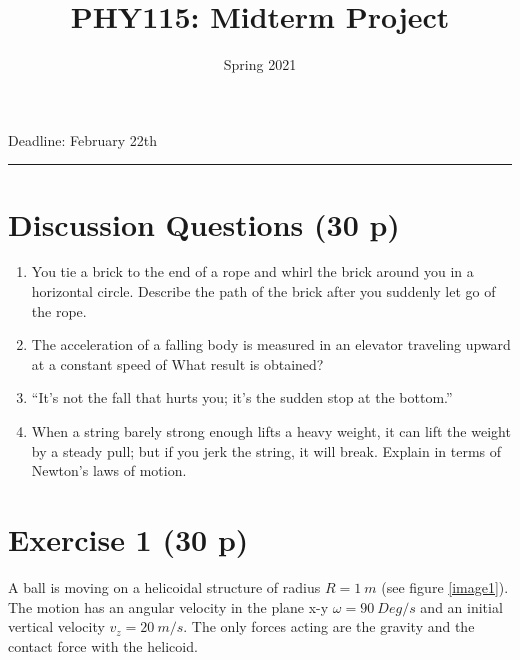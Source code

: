 \documentclass[12pt]{article}
\title{PHY115: Midterm Project}
\author{Spring 2021}
\date{}
\newcommand{\blankline}{\quad\pagebreak[2]}
\begin{document}
\maketitle





\begin{center}
 Deadline: February 22th    
\end{center}
\hrule






\section*{Discussion Questions (30 p)}

\begin{enumerate}
    \item You tie a brick to the end of a rope and whirl the brick around
    you in a horizontal circle. Describe the path of the brick after you
    suddenly let go of the rope.
    \item The acceleration of a falling body is measured in an elevator
    traveling upward at a constant speed of What result is
    obtained?
    \item “It’s not the fall that hurts you; it’s the sudden stop at the
    bottom.”
    \item When a string barely strong enough lifts a heavy weight, it
    can lift the weight by a steady pull; but if you jerk the string, it will
    break. Explain in terms of Newton’s laws of motion.


\end{enumerate}

\section*{Exercise 1 (30 p)}

A ball  is moving on a helicoidal structure of radius $R=1~m$ (see figure \ref{image1}). 
The motion has an angular velocity in the plane x-y $\omega=90~Deg/s$ and an 
initial vertical velocity $v_z=20~m/s$. The only forces acting are the gravity and 
the contact force with the helicoid.
\end{document}
